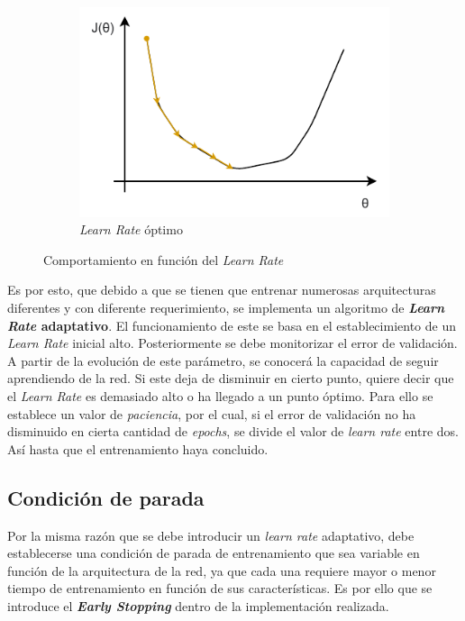 \begin{figure}[h]
\begin{subfigure}{0.49\textwidth}
        \includegraphics[width=\textwidth]{figuras/implementacion/learn rate optimo.pdf}
        \caption{\textit{Learn Rate} óptimo}
        \label{fig:LR_optimo}
    \end{subfigure}
\caption{Comportamiento en función del \textit{Learn Rate}}
\label{fig:learn_rate}
\end{figure}

Es por esto, que debido a que se tienen que entrenar numerosas arquitecturas diferentes y con diferente requerimiento, se implementa un algoritmo de \textbf{\textit{Learn Rate} adaptativo}. El funcionamiento de este se basa en el establecimiento de un \textit{Learn Rate} inicial alto. Posteriormente se debe monitorizar el error de validación. A partir de la evolución de este parámetro, se conocerá la capacidad de seguir aprendiendo de la red. Si este deja de disminuir en cierto punto, quiere decir que el \textit{Learn Rate} es demasiado alto o ha llegado a un punto óptimo. Para ello se establece un valor de \textit{paciencia}, por el cual, si el error de validación no ha disminuido en cierta cantidad de \textit{epochs}, se divide el valor de \textit{learn rate} entre dos. Así hasta que el entrenamiento haya concluido.

\subsection{Condición de parada}

Por la misma razón que se debe introducir un \textit{learn rate} adaptativo, debe establecerse una condición de parada de entrenamiento que sea variable en función de la arquitectura de la red, ya que cada una requiere mayor o menor tiempo de entrenamiento en función de sus características. Es por ello que se introduce el \textbf{\textit{Early Stopping}} \cite{Prechelt1998} dentro de la implementación realizada.

